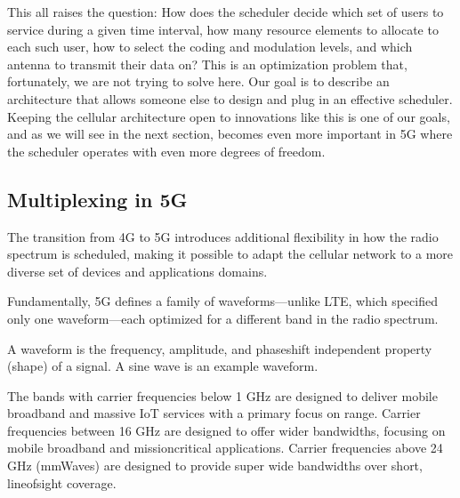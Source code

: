\documentclass[a4paper,11pt,english]{sphinxmanual}
\begin{document}
\sphinxAtStartPar
This all raises the question: How does the scheduler decide which set of
users to service during a given time interval, how many resource
elements to allocate to each such user, how to select the coding and
modulation levels, and which antenna to transmit their data on? This is
an optimization problem that, fortunately, we are not trying to solve
here. Our goal is to describe an architecture that allows someone else
to design and plug in an effective scheduler. Keeping the cellular
architecture open to innovations like this is one of our goals, and as
we will see in the next section, becomes even more important in 5G where
the scheduler operates with even more degrees of freedom.


\subsection{Multiplexing in 5G}
\label{\detokenize{primer:multiplexing-in-5g}}
\sphinxAtStartPar
The transition from 4G to 5G introduces additional flexibility in
how the radio spectrum is scheduled, making it possible to adapt the
cellular network to a more diverse set of devices and applications
domains.

\sphinxAtStartPar
Fundamentally, 5G defines a family of waveforms—unlike LTE, which
specified only one waveform—each optimized for a different band in the
radio spectrum.%
\begin{footnote}[2]\sphinxAtStartFootnote
A waveform is the frequency, amplitude, and phase\sphinxhyphen{}shift
independent property (shape) of a signal. A sine wave is an example
waveform.
%
\end{footnote}  The bands with carrier frequencies below 1 GHz are
designed to deliver mobile broadband and massive IoT services with a
primary focus on range. Carrier frequencies between 1\sphinxhyphen{}6 GHz are
designed to offer wider bandwidths, focusing on mobile broadband and
mission\sphinxhyphen{}critical applications. Carrier frequencies above 24 GHz
(mmWaves) are designed to provide super wide bandwidths over short,
line\sphinxhyphen{}of\sphinxhyphen{}sight coverage.
\end{document}
